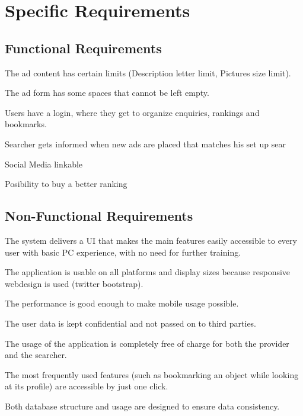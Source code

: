 \documentclass{scrreprt}
\begin{document}
\chapter{Specific Requirements}
\section{Functional Requirements}
\begin{list}{•}
\item The ad content has certain limits (Description letter limit, Pictures size limit).
\item The ad form has some spaces that cannot be left empty.
\item Users have a login, where they get to organize enquiries, rankings and bookmarks.
\item Searcher gets informed when new ads are placed that matches his set up sear
\item Social Media linkable	
\item Posibility to buy a better ranking 
\end{list}


\section{Non-Functional Requirements}
\begin{list}{•}
\item The system delivers a UI that makes the main features easily accessible to every user with basic PC experience, with no need for further training.
\item The application is usable on all platforms and display sizes because responsive webdesign is used (twitter bootstrap).
\item The performance is good enough to make mobile usage possible.
\item The user data is kept confidential and not passed on to third parties.
\item The usage of the application is completely free of charge for both the provider and the searcher.
\item The most frequently used features (such as bookmarking an object while looking at its profile) are accessible by just one click.
\item Both database structure and usage are designed to ensure data consistency.
\end{list}
\end{document}
